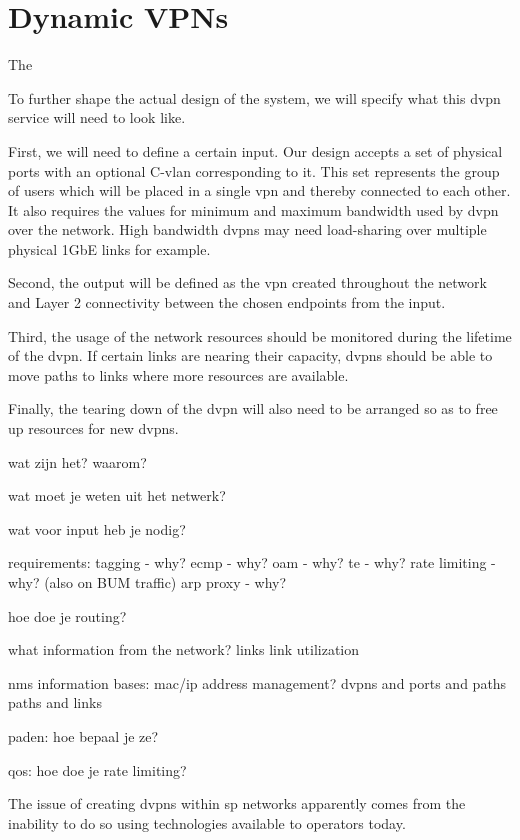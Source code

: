 \section{Dynamic VPNs} %
\label{sec:dvpns}

The 


To further shape the actual design of the system, we will specify what this \ac{dvpn} service will need to look like. 

First, we will need to define a certain input. Our design accepts a set of physical ports with an optional C-\ac{vlan} corresponding to it. This set represents the group of users which will be placed in a single \ac{vpn} and thereby connected to each other. It also requires the values for minimum and maximum bandwidth used by \ac{dvpn} over the network. High bandwidth \acp{dvpn} may need load-sharing over multiple physical 1GbE links for example.

Second, the output will be defined as the \ac{vpn} created throughout the network and Layer 2 connectivity between the chosen endpoints from the input.

Third, the usage of the network resources should be monitored during the lifetime of the \ac{dvpn}. If certain links are nearing their capacity, \acp{dvpn} should be able to move paths to links where more resources are available.

Finally, the tearing down of the \ac{dvpn} will also need to be arranged so as to free up resources for new \acp{dvpn}.


wat zijn het? waarom?

wat moet je weten uit het netwerk?

wat voor input heb je nodig?


requirements:
tagging - why?
ecmp - why?
oam - why?
te - why? 
rate limiting - why? (also on BUM traffic)
arp proxy - why?

hoe doe je routing?

what information from the network?
links
link utilization


nms information bases:
mac/ip address management?
dvpns and ports and paths
paths and links


paden:
hoe bepaal je ze?

qos:
hoe doe je rate limiting?



The issue of creating \acp{dvpn} within \ac{sp} networks apparently comes from the inability to do so using technologies available to operators today. 

